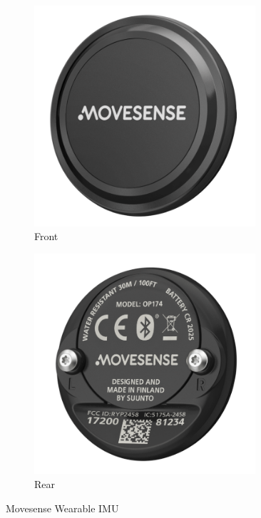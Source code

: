 \begin{figure}[!hbt]
    \centering
    \begin{subfigure}[b]{0.4\textwidth}
         \centering
         \includegraphics[width=0.9\textwidth]{content/3-Methods/movesense-persp-1000px.png}
    \caption{Front}
    \label{subfig:methods-movesense-sensor}
    \end{subfigure}
    \begin{subfigure}[b]{0.4\textwidth}
         \centering
         \includegraphics[width=0.9\textwidth]{content/3-Methods/Movesense-rear-1000px.png}
        \caption{Rear}
        \label{subfig:methods-movesense-rear}
    \end{subfigure}
    \caption[Movesense Wearable IMU]{Movesense Wearable IMU \cite{movesenseImg2019}}
    \label{fig:methods-movesense-sensor}
\end{figure}

